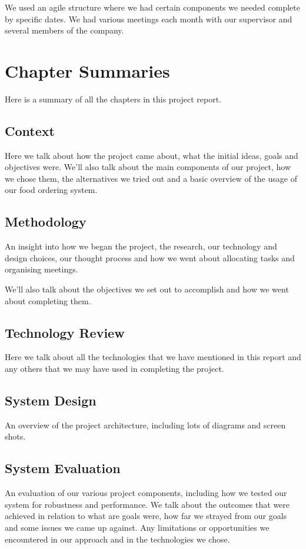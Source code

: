 We used an agile structure where we had certain components we needed complete by specific dates.
We had various meetings each month with our supervisor and several members of the company.

\section{Chapter Summaries}
Here is a summary of all the chapters in this project report.

\subsection*{Context}
Here we talk about how the project came about, what the initial ideas, goals and objectives were.
We'll also talk about the main components of our project, how we chose them, the alternatives we tried out and a basic overview of the usage of our food ordering system.

\subsection*{Methodology}
An insight into how we began the project, the research, our technology and design choices, our thought process and how we went about allocating tasks and organising meetings.

We'll also talk about the objectives we set out to accomplish and how we went about completing them.

\subsection*{Technology Review}
Here we talk about all the technologies that we have mentioned in this report and any others that we may have used in completing the project.

\subsection*{System Design}
An overview of the project architecture, including lots of diagrams and screen shots.

\subsection*{System Evaluation}
An evaluation of our various project components, including how we tested our system for robustness and performance.
We talk about the outcomes that were achieved in relation to what are goals were, how far we strayed from our goals and some issues we came up against.
Any limitations or opportunities we encountered in our approach and in the technologies we chose.

